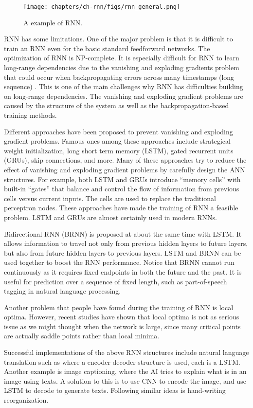 \begin{figure}
	\centering
	\texttt{[image: chapters/ch-rnn/figs/rnn\_general.png]}
	\caption{A example of RNN.} \label{ch:rnn:fig:rnn_general}
\end{figure}

RNN has some limitations. One of the major problem is that it is difficult to train an RNN even for the basic standard feedforward networks. The optimization of RNN is NP-complete. It is especially difficult for RNN to learn long-range dependencies due to the vanishing and exploding gradients problem that could occur when backpropagating errors across many timestamps (long sequence) \cite{lipton2015critical}. This is one of the main challenges why RNN has difficulties building on long-range dependencies. The vanishing and exploding gradient problems are caused by the structure of the system as well as the backpropagation-based training methods.

Different approaches have been proposed to prevent vanishing and exploding gradient problems. Famous ones among these approaches include strategical weight initialization, long short term memory (LSTM), gated recurrent units (GRUs), skip connections, and more. Many of these approaches try to reduce the effect of vanishing and exploding gradient problems by carefully design the ANN structures. For example, both LSTM and GRUs introduce ``memory cells'' with built-in ``gates'' that balance and control the flow of information from previous cells versus current inputs. The cells are used to replace the traditional perceptron nodes. These approaches have made the training of RNN a feasible problem. LSTM and GRUs are almost certainly used in modern RNNs.

Bidirectional RNN (BRNN) is proposed at about the same time with LSTM. It allows information to travel not only from previous hidden layers to future layers, but also from future hidden layers to previous layers. LSTM and BRNN can be used together to boost the RNN performance. Notice that BRNN cannot run continuously as it requires fixed endpoints in both the future and the past. It is useful for prediction over a sequence of fixed length, such as part-of-speech tagging in natural language processing.

Another problem that people have found during the training of RNN is local optima. However, recent studies have shown that local optima is not as serious issue as we might thought when the network is large, since many critical points are actually saddle points rather than local minima.

Successful implementations of the above RNN structures include natural language translation such as \cite{sutskever2014sequence} where a encoder-decoder structure is used, each is a LSTM. Another example is image captioning, where the AI tries to explain what is in an image using texts. A solution to this is to use CNN to encode the image, and use LSTM to decode to generate texts. Following similar ideas is hand-writing reorganization.